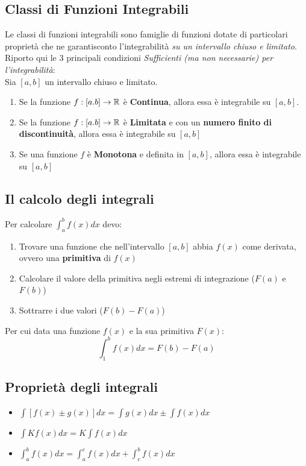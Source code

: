 \documentclass[12pt, a4paper, openany]{book}
\begin{document}
	\subsection{Classi di Funzioni Integrabili}
	Le classi di funzioni integrabili sono famiglie di funzioni dotate di particolari proprietà che ne garantisconto l'integrabilità \emph{su un intervallo chiuso e limitato}.
	Riporto qui le 3 principali condizioni \emph{Sufficienti (ma non necessarie) per l'integrabilità}:
	\\Sia $[a,b]$ un intervallo chiuso e limitato.
	\begin{enumerate}
		\item Se la funzione $f:[a.b] \to \mathbb{R}$ è \textbf{Continua}, allora essa è integrabile su $[a,b]$.
		\item Se la funzione $f:[a.b] \to \mathbb{R}$ è \textbf{Limitata} e con un \textbf{numero finito di discontinuità}, allora essa è integrabile su $[a,b]$
		\item Se una funzione $f$ è \textbf{Monotona} e definita in $[a,b]$, allora essa è integrabile su $[a,b]$ 
	\end{enumerate}


	\subsection{Il calcolo degli integrali}
	Per calcolare $\int_{a}^{b} f(x) dx$ devo:
	\begin{enumerate}
		\item Trovare una funzione che nell'intervallo $[a,b]$ abbia $f(x)$ come derivata, ovvero una \textbf{primitiva} di $f(x)$
		\item Calcolare il valore della primitiva negli estremi di integrazione ($F(a)$ e $F(b)$)
		\item Sottrarre i due valori ($F(b)-F(a)$)
	\end{enumerate}
	Per cui data una funzione $f(x)$ e la sua primitiva $F(x)$: $$\int_{1}^{b} f(x)dx = F(b)- F(a)$$


	\subsection{Proprietà degli integrali}
	\begin{itemize}
		\item $\int[f(x) \pm g(x)] dx = \int g(x) dx \pm \int f(x) dx$
		\item $\int K f(x) dx = K\int f(x) dx$
		\item $\int_{a}^{b} f(x) dx = \int_{a}^{c} f(x) dx + \int_{c}^{b} f(x) dx$
	\end{itemize}
\end{document}
